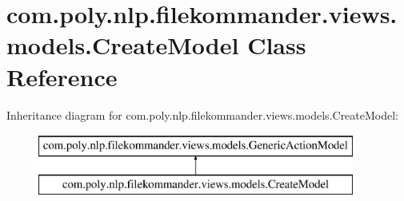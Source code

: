 \hypertarget{classcom_1_1poly_1_1nlp_1_1filekommander_1_1views_1_1models_1_1_create_model}{\section{com.\-poly.\-nlp.\-filekommander.\-views.\-models.\-Create\-Model Class Reference}
\label{classcom_1_1poly_1_1nlp_1_1filekommander_1_1views_1_1models_1_1_create_model}
}
Inheritance diagram for com.\-poly.\-nlp.\-filekommander.\-views.\-models.\-Create\-Model\-:\begin{figure}[H]
\begin{center}
\leavevmode
\includegraphics[height=2.000000cm]{classcom_1_1poly_1_1nlp_1_1filekommander_1_1views_1_1models_1_1_create_model}
\end{center}
\end{figure}
